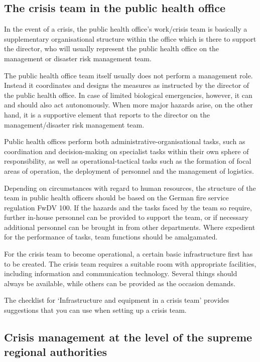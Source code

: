\documentclass{article}
\begin{document}
\subsection{The crisis team in the public health office}\label{H2640525}



In the event of a crisis, the public health office's work/crisis team is basically a supplementary organisational structure within the office which is there to support the director, who will usually represent the public health office on the management or disaster risk management team.


The public health office team itself usually does not perform a management role. Instead it coordinates and designs the measures as instructed by the director of the public health office. In case of limited biological emergencies, however, it can and should also act autonomously. When more major hazards arise, on the other hand, it is a supportive element that reports to the director on the management/disaster risk management team.


Public health offices perform both administrative-organisational tasks, such as coordination and decision-making on specialist tasks within their own sphere of responsibility, as well as operational-tactical tasks such as the formation of focal areas of operation, the deployment of personnel and the management of logistics.


Depending on circumstances with regard to human resources, the structure of the team in public health officers should be based on the German fire service regulation FwDV 100. If the hazards and the tasks faced by the team so require, further in-house personnel can be provided to support the team, or if necessary additional personnel can be brought in from other departments. Where expedient for the performance of tasks, team functions should be amalgamated.


For the crisis team to become operational, a certain basic infrastructure first has to be created. The crisis team requires a suitable room with appropriate facilities, including information and communication technology. Several things should always be available, while others can be provided as the occasion demands.


The checklist for ‘Infrastructure and equipment in a crisis team' provides suggestions that you can use when setting up a crisis team.


\subsection{Crisis management at the level of the supreme regional authorities}\label{H6397345}
\end{document}
